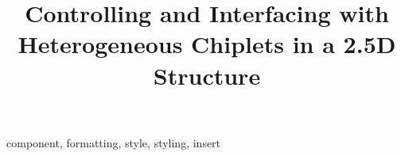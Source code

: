 \documentclass[10pt,conference]{IEEEtran}
\begin{document}
\title{Controlling and Interfacing with Heterogeneous Chiplets in a 2.5D Structure}

\author{
}

\maketitle



\begin{IEEEkeywords}
component, formatting, style, styling, insert
\end{IEEEkeywords}

















\end{document}
